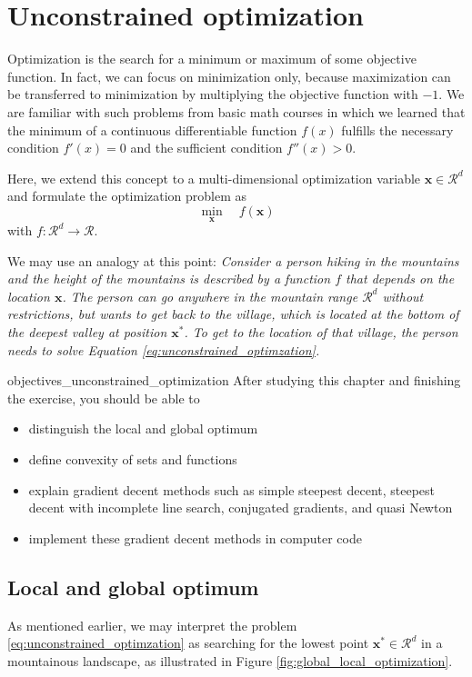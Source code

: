 \chapter{Unconstrained optimization}
Optimization is the search for a minimum or maximum of some objective function. In fact, we can focus on minimization only, because maximization can be transferred to minimization by multiplying the objective function with $-1$. 
We are familiar with such problems from basic math courses in which we learned that the minimum of a continuous differentiable function $f(x)$ fulfills the necessary condition $f'(x)=0$ and the sufficient condition $f''(x) > 0$. 

Here, we extend this concept to a multi-dimensional optimization variable $\mathbf{x} \in \mathcal{R}^d$ and formulate the optimization problem as 
\begin{equation}
    \min_{\mathbf{x}} \quad f(\mathbf{x})
   \label{eq:unconstrained_optimzation}
\end{equation}
with $f: \mathcal{R}^d \rightarrow \mathcal{R}$.

We may use an analogy at this point: \emph{Consider a person hiking in the mountains and the height of the mountains is described by a function $f$ that depends on the location $\mathbf{x}$. The person can go anywhere in the mountain range $\mathcal{R}^d$ without restrictions, but wants to get back to the village, which is located at the bottom of the deepest valley at position $\mathbf{x}^*$. To get to the location of that village, the person needs to solve Equation \eqref{eq:unconstrained_optimzation}.}

\begin{objectives}{}{objectives_unconstrained_optimization}
After studying this chapter and finishing the exercise, you should be able to 
\begin{itemize}[label=$\dots$]
    \item distinguish the local and global optimum
    \item define convexity of sets and functions
    \item explain gradient decent methods such as simple steepest decent, steepest decent with incomplete line search, conjugated gradients, and quasi Newton 
    \item implement these gradient decent methods in computer code
\end{itemize}
\end{objectives}

\section{Local and global optimum}
As mentioned earlier, we may interpret the problem \eqref{eq:unconstrained_optimzation} as searching for the lowest point $\mathbf{x}^* \in \mathcal{R}^d$ in a mountainous landscape, as illustrated in Figure \ref{fig:global_local_optimization}. 

